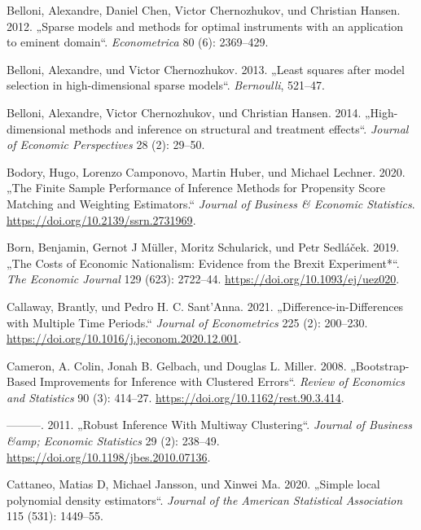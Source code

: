 \documentclass[
  a4paper,
  DIV=11,
  oneside]{scrreprt}
\newlength{\cslhangindent}
\newenvironment{CSLReferences}[2] %
 {\begin{list}{}{%
  \setlength{\itemindent}{0pt}
  \setlength{\leftmargin}{0pt}
  \setlength{\parsep}{0pt}
  \ifodd #1
   \setlength{\leftmargin}{\cslhangindent}
   \setlength{\itemindent}{-1\cslhangindent}
  \fi
  \setlength{\itemsep}{#2\baselineskip}}}
 {\end{list}}
\begin{document}
\begin{CSLReferences}{1}{0}
Belloni, Alexandre, Daniel Chen, Victor Chernozhukov, und Christian
Hansen. 2012. {„Sparse models and methods for optimal instruments with
an application to eminent domain``}. \emph{Econometrica} 80 (6):
2369--429.

Belloni, Alexandre, und Victor Chernozhukov. 2013. {„Least squares after
model selection in high-dimensional sparse models``}. \emph{Bernoulli},
521--47.

Belloni, Alexandre, Victor Chernozhukov, und Christian Hansen. 2014.
{„High-dimensional methods and inference on structural and treatment
effects``}. \emph{Journal of Economic Perspectives} 28 (2): 29--50.

Bodory, Hugo, Lorenzo Camponovo, Martin Huber, und Michael Lechner.
2020. {„The Finite Sample Performance of Inference Methods for
Propensity Score Matching and Weighting Estimators.``} \emph{Journal of
Business \& Economic Statistics}.
\url{https://doi.org/10.2139/ssrn.2731969}.

Born, Benjamin, Gernot J Müller, Moritz Schularick, und Petr Sedláček.
2019. {„The Costs of Economic Nationalism: Evidence from the Brexit
Experiment*``}. \emph{The Economic Journal} 129 (623): 2722--44.
\url{https://doi.org/10.1093/ej/uez020}.

Callaway, Brantly, und Pedro H. C. Sant'Anna. 2021.
{„Difference-in-Differences with Multiple Time Periods.``} \emph{Journal
of Econometrics} 225 (2): 200--230.
\url{https://doi.org/10.1016/j.jeconom.2020.12.001}.

Cameron, A. Colin, Jonah B. Gelbach, und Douglas L. Miller. 2008.
{„Bootstrap-Based Improvements for Inference with Clustered Errors``}.
\emph{Review of Economics and Statistics} 90 (3): 414--27.
\url{https://doi.org/10.1162/rest.90.3.414}.

---------. 2011. {„Robust Inference With Multiway Clustering``}.
\emph{Journal of Business \&amp; Economic Statistics} 29 (2): 238--49.
\url{https://doi.org/10.1198/jbes.2010.07136}.

Cattaneo, Matias D, Michael Jansson, und Xinwei Ma. 2020. {„Simple local
polynomial density estimators``}. \emph{Journal of the American
Statistical Association} 115 (531): 1449--55.


\end{CSLReferences}
\end{document}
